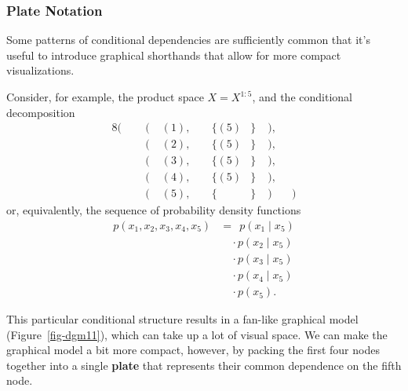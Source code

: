 \documentclass[
  letterpaper,
  DIV=11,
  numbers=noendperiod]{scrartcl}
\begin{document}
\subsubsection{Plate Notation}\label{plate-notation}

Some patterns of conditional dependencies are sufficiently common that
it's useful to introduce graphical shorthands that allow for more
compact visualizations.

Consider, for example, the product space \(X = X^{1:5}\), and the
conditional decomposition \begin{alignat*}{8}
(& \;\; &( \; &(1),& &\{ (5) &\} \; &), &
\\
 & \;\; &( \; &(2),& &\{ (5) &\} \; &), &
\\
 & &( \; &(3),& \; &\{ (5) &\} \; &), &
\\
 & &( \; &(4),& \; &\{ (5) &\} \; &), &
\\
 & &( \; &(5),& \; &\{  &\} \; &)  &\;\;)
\end{alignat*} or, equivalently, the sequence of probability density
functions \begin{align*}
p( x_{1}, x_{2}, x_{3}, x_{4}, x_{5} )
&= \;\,
p( x_{1} \mid x_{5} )
\\
&\quad \cdot
p( x_{2} \mid x_{5} )
\\
&\quad \cdot
p( x_{3} \mid x_{5} )
\\
&\quad \cdot
p( x_{4} \mid x_{5} )
\\
&\quad \cdot
p( x_{5} ).
\end{align*}

This particular conditional structure results in a fan-like graphical
model (Figure~\ref{fig-dgm11}), which can take up a lot of visual space.
We can make the graphical model a bit more compact, however, by packing
the first four nodes together into a single \textbf{plate} that
represents their common dependence on the fifth node.
\end{document}

